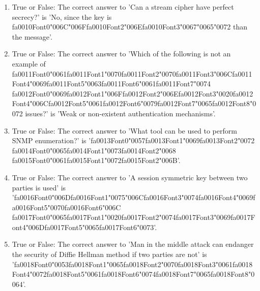 \documentclass[12pt]{article}
\begin{document}
\begin{enumerate}[label=\arabic*.]
\item True or False: The correct answer to 'Can a stream cipher have perfect secrecy?' is 'No, since the key is {\csname fa0010Font0\endcsname\char"006C}{\char"006F}{\csname fa0010Font2\endcsname\char"006E}{\csname fa0010Font3\endcsname\char"0067}{\char"0065}{\char"0072} than the message'.
\item True or False: The correct answer to 'Which of the following is not an example of {\csname fa0011Font0\endcsname\char"0061}{\csname fa0011Font1\endcsname\char"0070}{\csname fa0011Font2\endcsname\char"0070}{\csname fa0011Font3\endcsname\char"006C}{\csname fa0011Font4\endcsname\char"0069}{\csname fa0011Font5\endcsname\char"0063}{\csname fa0011Font6\endcsname\char"0061}{\csname fa0011Font7\endcsname\char"0074} {\csname fa0012Font0\endcsname\char"0069}{\csname fa0012Font1\endcsname\char"006F}{\csname fa0012Font2\endcsname\char"006E}{\csname fa0012Font3\endcsname\char"0020}{\csname fa0012Font4\endcsname\char"006C}{\csname fa0012Font5\endcsname\char"0061}{\csname fa0012Font6\endcsname\char"0079}{\csname fa0012Font7\endcsname\char"0065}{\csname fa0012Font8\endcsname\char"0072} issues?' is 'Weak or non-existent authentication mechanisms'.
\item True or False: The correct answer to 'What tool can be used to perform SNMP enumeration?' is '{\csname fa0013Font0\endcsname\char"0057}{\csname fa0013Font1\endcsname\char"0069}{\csname fa0013Font2\endcsname\char"0072} {\csname fa0014Font0\endcsname\char"0065}{\csname fa0014Font1\endcsname\char"0073}{\csname fa0014Font2\endcsname\char"0068} {\csname fa0015Font0\endcsname\char"0061}{\csname fa0015Font1\endcsname\char"0072}{\csname fa0015Font2\endcsname\char"006B}'.
\item True or False: The correct answer to 'A session symmetric key between two parties is used' is '{\csname fa0016Font0\endcsname\char"006D}{\csname fa0016Font1\endcsname\char"0075}{\char"006C}{\csname fa0016Font3\endcsname\char"0074}{\csname fa0016Font4\endcsname\char"0069}{\csname fa0016Font5\endcsname\char"0070}{\csname fa0016Font6\endcsname\char"006C} {\csname fa0017Font0\endcsname\char"0065}{\csname fa0017Font1\endcsname\char"0020}{\csname fa0017Font2\endcsname\char"0074}{\csname fa0017Font3\endcsname\char"0069}{\csname fa0017Font4\endcsname\char"006D}{\csname fa0017Font5\endcsname\char"0065}{\csname fa0017Font6\endcsname\char"0073}'.
\item True or False: The correct answer to 'Man in the middle attack can endanger the security of Diffie Hellman method if two parties are not' is '{\csname fa0018Font0\endcsname\char"0053}{\csname fa0018Font1\endcsname\char"0065}{\csname fa0018Font2\endcsname\char"0070}{\csname fa0018Font3\endcsname\char"0061}{\csname fa0018Font4\endcsname\char"0072}{\csname fa0018Font5\endcsname\char"0061}{\csname fa0018Font6\endcsname\char"0074}{\csname fa0018Font7\endcsname\char"0065}{\csname fa0018Font8\endcsname\char"0064}'.

\end{enumerate}
\end{document}
